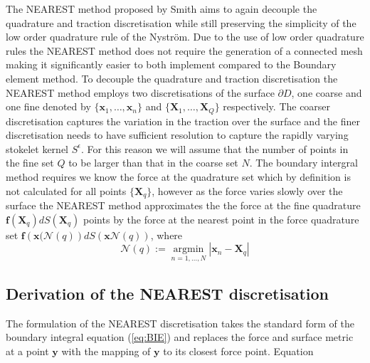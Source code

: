 The NEAREST method proposed by Smith \cite{Smith2018AEquation} aims to again decouple the quadrature and traction discretisation while still preserving the simplicity of the low order quadrature rule of the Nyström. Due to the use of low order quadrature rules the NEAREST method does not require the generation of a connected mesh making it significantly easier to both implement compared to the Boundary element method. To decouple the quadrature and traction discretisation the NEAREST method employs two discretisations of the surface $\partial D$, one coarse and one fine denoted by $\{\bm{x}_1, \dots, \bm{x}_n\}$ and $\{\bm{X}_1, \dots, \bm{X}_Q\}$ respectively. The coarser discretisation captures the variation in the traction over the surface and the finer discretisation needs to have sufficient resolution to capture the rapidly varying stokelet kernel $S^\epsilon$. For this reason we will assume that the number of points in the fine set $Q$ to be larger than that in the coarse set $N$. The boundary intergral method requires we know the force at the quadrature set which by definition is not calculated for all points $\{\bm{X}_q\}$, however as the force varies slowly over the surface the NEAREST method approximates the the force at the fine quadrature $\bm{f}(\bm{X}_q)dS(\bm{X}_q)$ points by the force at the nearest point in the force quadrature set $\bm{f}\left(\bm{x}(\mathcal{N}(q)\right) d S(\bm{x}\mathcal{N}(q))$, where 
\begin{equation}
\label{eq:NEARESTmap}
    \mathcal{N}(q) := \underset{n=1, \ldots, N}{\operatorname{argmin}}|\boldsymbol{x}_n-\boldsymbol{X}_q|
\end{equation}

\subsection{Derivation of the NEAREST discretisation}
The formulation of the NEAREST discretisation takes the standard form of the boundary integral equation (\cref{eq:BIE}) and replaces the force and surface metric at a point $\bm{y}$ with the mapping of $\bm{y}$ to its closest force point. Equation

